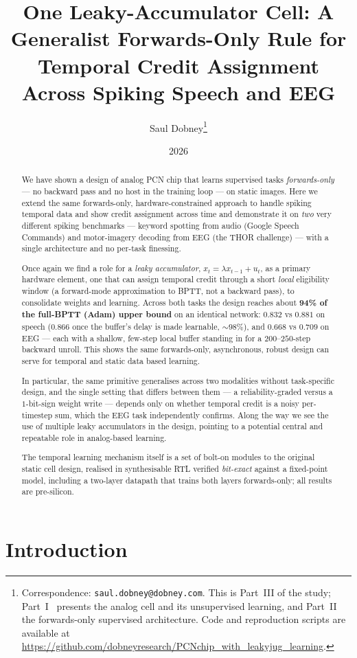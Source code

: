 \documentclass[11pt]{article}
\title{\bfseries One Leaky-Accumulator Cell: A Generalist Forwards-Only Rule for\\
Temporal Credit Assignment Across Spiking Speech and EEG}
\author{Saul Dobney\thanks{Correspondence: \texttt{saul.dobney@dobney.com}.
This is Part~III of the study; Part~I~\cite{dobney2026analog} presents the analog cell and its
unsupervised learning, and Part~II~\cite{dobney2026forwards} the forwards-only supervised
architecture. Code and reproduction scripts are available at
\url{https://github.com/dobneyresearch/PCNchip_with_leakyjug_learning}.}}
\date{2026}
\begin{document}
\maketitle

\begin{abstract}
We have shown a design of analog PCN chip that learns supervised tasks
\emph{forwards-only} --- no backward pass and no host in the training
loop --- on static images. Here we extend the same forwards-only,
hardware-constrained approach to handle spiking temporal data and show
credit assignment across time and demonstrate it on \emph{two} very
different spiking benchmarks --- keyword spotting from audio (Google
Speech Commands) and motor-imagery decoding from EEG (the THOR
challenge) --- with a single architecture and no per-task finessing.

Once again we find a role for a \emph{leaky accumulator},
\(x_t = \lambda x_{t-1} + u_t\), as a primary hardware element, one that
can assign temporal credit through a short \emph{local} eligibility
window (a forward-mode approximation to BPTT, not a backward pass), to
consolidate weights and learning. Across both tasks the design reaches
about \textbf{94\% of the full-BPTT (Adam) upper bound} on an identical
network: \(0.832\) vs \(0.881\) on speech (\(0.866\) once the buffer's
delay is made learnable, \({\sim}98\%\)), and \(0.668\) vs \(0.709\) on
EEG --- each with a shallow, few-step local buffer standing in for a
\(200\)--\(250\)-step backward unroll. This shows the same
forwards-only, asynchronous, robust design can serve for temporal and
static data based learning.

In particular, the same primitive generalises across two modalities
without task-specific design, and the single setting that differs
between them --- a reliability-graded versus a \(1\)-bit-sign weight
write --- depends only on whether temporal credit is a noisy
per-timestep sum, which the EEG task independently confirms. Along the
way we see the use of multiple leaky accumulators in the design,
pointing to a potential central and repeatable role in analog-based
learning.

The temporal learning mechanism itself is a set of bolt-on modules to
the original static cell design, realised in synthesisable RTL verified
\emph{bit-exact} against a fixed-point model, including a two-layer
datapath that trains both layers forwards-only; all results are
pre-silicon.
\end{abstract}

\hypertarget{sec:intro}{%
\section{Introduction}\label{sec:intro}}
\end{document}
